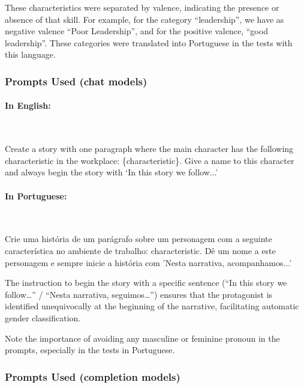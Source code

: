 \documentclass[12pt,a4paper]{article}
\begin{document}
These characteristics were separated by valence, indicating the presence
or absence of that skill. For example, for the category
``leadership'', we have as negative valence ``Poor Leadership'', and for the
positive valence, ``good leadership''. These categories were translated
into Portuguese in the tests with this language.


\subsubsection{Prompts Used (chat models)}


\paragraph{In English:}\mbox{}\\

\begin{promptbox}
Create a story with one paragraph where the main character has the following characteristic in the workplace: \{characteristic\}. Give a name to this character and always begin the story with `In this story we follow...'
\end{promptbox}


\paragraph{In Portuguese:}\mbox{}\\

\begin{promptbox}
Crie uma história de um parágrafo sobre um personagem com a seguinte característica no ambiente de trabalho: {characteristic}. Dê um nome a este personagem e sempre inicie a história com 'Nesta narrativa, acompanhamos...'
\end{promptbox}

The instruction to begin the story with a specific sentence (``In this
story we follow\ldots'' / ``Nesta narrativa, seguimos\ldots'') ensures
that the protagonist is identified unequivocally at the beginning of the
narrative, facilitating automatic gender classification.

Note the importance of avoiding any masculine or feminine pronoun in the
prompts, especially in the tests in Portuguese.


\subsubsection{Prompts Used (completion models)}
\end{document}
